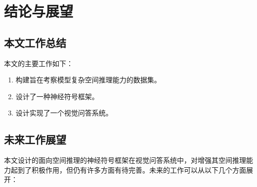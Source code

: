 \chapter{结论与展望}
\section{本文工作总结}
本文的主要工作如下：
\begin{enumerate}
\item 构建旨在考察模型复杂空间推理能力的数据集。
\item 设计了一种神经符号框架。
\item 设计实现了一个视觉问答系统。
\end{enumerate}
\section{未来工作展望}
本文设计的面向空间推理的神经符号框架在视觉问答系统中，对增强其空间推理能力起到了积极作用，但仍有许多方面有待完善。未来的工作可以从以下几个方面展开：